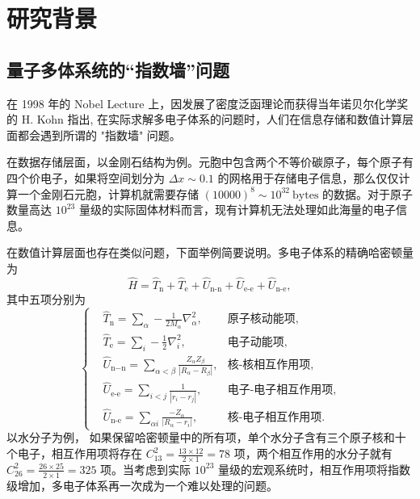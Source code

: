 \chapter{研究背景}
\section{量子多体系统的“指数墙”问题}
在 1998 年的 Nobel Lecture 上，因发展了密度泛函理论而获得当年诺贝尔化学奖的 H. Kohn 指出, 在实际求解多电子体系的问题时，人们在信息存储和数值计算层面都会遇到所谓的 "指数墙" 问题\cite{Kohn1999}。

在数据存储层面，以金刚石结构为例。元胞中包含两个不等价碳原子，每个原子有四个价电子，如果将空间划分为 $\Delta x\sim 0.1$ 的网格用于存储电子信息，那么仅仅计算一个金刚石元胞，计算机就需要存储 $(10000)^8\sim 10^{32}~\text{bytes}$ 的数据。对于原子数量高达 $10^{23}$ 量级的实际固体材料而言，现有计算机无法处理如此海量的电子信息。

在数值计算层面也存在类似问题，下面举例简要说明。多电子体系的精确哈密顿量为
\begin{equation}
    \hat{H}=\hat{T}_{\text{n}}+\hat{T}_{\text{e}}+\hat{U}_{\text{n-n}}+\hat{U}_{\text{e-e}}+\hat{U}_{\text{n-e}},
\end{equation}
其中五项分别为
\begin{equation}
    \left\{
        \begin{aligned}
            &\hat{T}_{\text{n}}=\sum_{\alpha}-\frac{1}{2M_{\alpha}}\nabla_\alpha^2,\quad &\text{原子核动能项,}\\
            &\hat{T}_{\text{e}}=\sum_i -\frac{1}{2}\nabla_i^2,&\text{电子动能项,}\\
            &\hat{U}_{\text{n}-\text{n}}=\sum_{\alpha<\beta}\frac{Z_{\alpha}Z_{\beta}}{\left| R_{\alpha}-R_{\beta} \right|},&\text{核-核相互作用项},\\
            &\hat{U}_{\text{e-e}}=\sum_{i<j}\frac{1}{\left| r_i-r_j \right|},&\text{电子-电子相互作用项},\\
            &\hat{U}_{\text{n-e}}=\sum_{\alpha i}\frac{-Z_\alpha}{\left| R_\alpha-r_i \right|},&\text{核-电子相互作用项}.
        \end{aligned}\right.
\end{equation}
以水分子为例， 如果保留哈密顿量中的所有项，单个水分子含有三个原子核和十个电子，相互作用项将存在 $C_{13}^2=\frac{13\times 12}{2\times 1}=78$ 项，两个相互作用的水分子就有 $C_{26}^2=\frac{26\times 25}{2\times 1}=325$ 项。当考虑到实际 $10^{23}$ 量级的宏观系统时，相互作用项将指数级增加，多电子体系再一次成为一个难以处理的问题。

